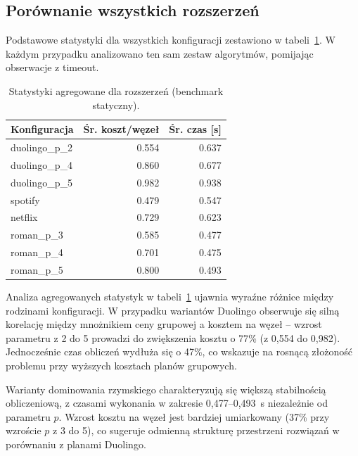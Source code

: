 \subsection{Porównanie wszystkich rozszerzeń}

Podstawowe statystyki dla wszystkich konfiguracji zestawiono w tabeli~\ref{tab:ext-overall-static}. W każdym przypadku analizowano ten sam zestaw algorytmów, pomijając obserwacje z timeout.

\begin{table}[H]
  \centering
  \caption{Statystyki agregowane dla rozszerzeń (benchmark statyczny).}
  \label{tab:ext-overall-static}
  \begin{tabular}{lrr}
    \toprule
    \textbf{Konfiguracja} & \textbf{Śr. koszt/węzeł} & \textbf{Śr. czas [s]} \\
    \midrule
    duolingo\_p\_2        & 0.554                    & 0.637                 \\
    duolingo\_p\_4        & 0.860                    & 0.677                 \\
    duolingo\_p\_5        & 0.982                    & 0.938                 \\
    spotify               & 0.479                    & 0.547                 \\
    netflix               & 0.729                    & 0.623                 \\
    roman\_p\_3           & 0.585                    & 0.477                 \\
    roman\_p\_4           & 0.701                    & 0.475                 \\
    roman\_p\_5           & 0.800                    & 0.493                 \\
  \end{tabular}
\end{table}

Analiza agregowanych statystyk w tabeli~\ref{tab:ext-overall-static} ujawnia wyraźne różnice między rodzinami konfiguracji. W przypadku wariantów Duolingo obserwuje się silną korelację między mnożnikiem ceny grupowej a kosztem na węzeł -- wzrost parametru z 2 do 5 prowadzi do zwiększenia kosztu o 77\% (z 0,554 do 0,982). Jednocześnie czas obliczeń wydłuża się o 47\%, co wskazuje na rosnącą złożoność problemu przy wyższych kosztach planów grupowych.

Warianty dominowania rzymskiego charakteryzują się większą stabilnością obliczeniową, z czasami wykonania w zakresie 0,477--0,493~s niezależnie od parametru $p$. Wzrost kosztu na węzeł jest bardziej umiarkowany (37\% przy wzroście $p$ z 3 do 5), co sugeruje odmienną strukturę przestrzeni rozwiązań w porównaniu z planami Duolingo.


